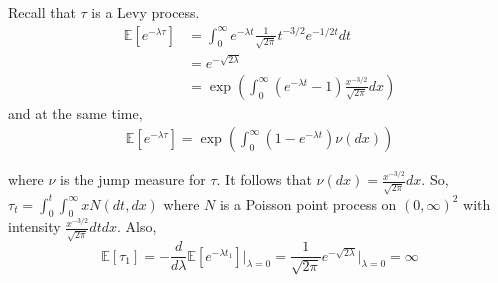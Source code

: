 \documentclass{article}
\newcommand{\E}{\mathbb{E}}    %
\theoremstyle{definition}
\begin{document}
	Recall that $\tau$ is a Levy process.
	$$
	\begin{aligned}
	\E \left[ e^{- \lambda \tau} \right] 
	& = \int_{0}^{\infty} e^{- \lambda t} \frac{1}{\sqrt{2 \pi}} t^{-3/2} e^{-1/2t} dt \\	
	& = e^{- \sqrt{2\lambda}} \\
	& = \exp \left( \int_{0}^{\infty} (e^{-\lambda t } - 1) \frac{x^{-3/2}}{\sqrt{2 \pi}} dx \right)
	\end{aligned}
	$$
	and at the same time,
	$$
	\begin{aligned}
	\E \left[ e^{-\lambda \tau} \right]
	= \exp \left( \int_{0}^{\infty} (1 - e^{-\lambda t }) \nu(dx) \right)
	\end{aligned}
	$$
	
	where $\nu$ is the jump measure for $\tau.$ It follows that $\nu(dx)=\frac{x^{-3/2}}{\sqrt{2 \pi}}dx.$
	So,
	$\tau_t = \int_{0}^{t} \int_{0}^{\infty} x N(dt, dx)$
	where $N$ is a Poisson point process on $\left( 0 ,\infty \right)^2$ with intensity $\frac{x^{-3/2}}{\sqrt{2 \pi}}dtdx.$
	Also,
	$$
	\E \left[ \tau_1 \right] 
	= -\frac{d}{d\lambda} \E \left[ e^{-\lambda t_1} \right]\big|_{\lambda=0}
	= \frac{1}{\sqrt{2 \pi}}e^{-\sqrt{2\lambda}}\big|_{\lambda=0}
	= \infty
	$$
	
	
	
\end{document}
